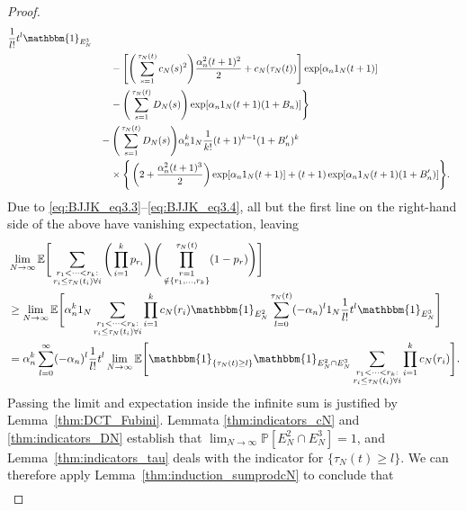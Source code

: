 \documentclass[12pt,authoryear]{article}
\theoremstyle{definition}
\newcommand{\Prob}{\mathbb{P}}
\newcommand{\E}{\mathbb{E}}
\newcommand{\I}[1]{\mathbbm{1}_{\{#1\}}}
\newcommand{\1}[1]{\mathbbm{1}_{#1}}
\newcommand{\ON}{1_N}
\begin{document}
\begin{proof}
\begin{align*}
        \frac{1}{l!} t^l \1{E_N^3} \\
    &\phantom{\geq \times} - \Bigg[ \Bigg( \sum_{s=1}^{\tau_N(t)} c_N(s)^2 \Bigg)
        \frac{\alpha_n^2 (t+1)^2}{2} + c_N(\tau_N(t)) \Bigg] \exp[ \alpha_n \ON (t+1) ] \\
    &\phantom{\geq \times}
    - \Bigg( \sum_{s=1}^{\tau_N(t)} D_N(s) \Bigg)
        \exp[ \alpha_n \ON (t+1) (1+B_n) ] \Bigg\} \\
&\phantom{\geq} - \Bigg( \sum_{s=1}^{\tau_N(t)} D_N(s) \Bigg)
        \alpha_n^k \ON \frac{1}{k!}
        (t+1)^{k-1} (1+B_n^\prime)^k \\
    &\phantom{\geq -} \times \Bigg\{\left( 2 + \frac{\alpha_n^2 (t+1)^3}{2} \right) 
        \exp[ \alpha_n \ON (t+1) ] + (t+1) \exp[ \alpha_n \ON (t+1) (1+B_n^\prime) ] 
        \Bigg\} .
\end{align*}
Due to \eqref{eq:BJJK_eq3.3}--\eqref{eq:BJJK_eq3.4}, all but the first line on the right-hand side of the above have vanishing expectation, leaving
\begin{align}
&\lim_{N\to\infty} \E \Bigg[ 
        \sum_{\substack{r_1 <\dots< r_k :\\ r_i \leq \tau_N(t_i) \forall i}}
        \Bigg( \prod_{i=1}^k p_{r_i} \Bigg)
        \Bigg( \prod_{\substack{r=1 \\ \notin \{r_1,\dots,r_k\} }}^{\tau_N(t)} 
        (1-p_r) \Bigg) \Bigg] \notag\\
&\geq \lim_{N\to\infty} \E \Bigg[ \alpha_n^k \ON
        \sum_{\substack{r_1 <\dots< r_k :\\ r_i \leq \tau_N(t_i) \forall i}}
        \prod_{i=1}^k c_N(r_i) \1{E_N^2}
        \sum_{l=0}^{\tau_N(t)} (-\alpha_n)^l \ON 
        \frac{1}{l!} t^l \1{E_N^3} \Bigg] \notag\\
&= \alpha_n^k
        \sum_{l=0}^{\infty} (-\alpha_n)^l
        \frac{1}{l!} t^l
        \lim_{N\to\infty}\E\Bigg[ \I{\tau_N(t) \geq l} \1{E_N^2\cap E_N^3}
        \sum_{\substack{r_1 <\dots< r_k :\\ r_i \leq \tau_N(t_i) \forall i}}
        \prod_{i=1}^k c_N(r_i) \Bigg] . \label{eq:056}
\end{align}
Passing the limit and expectation inside the infinite sum is justified by Lemma~\ref{thm:DCT_Fubini}.
Lemmata \ref{thm:indicators_cN} and \ref{thm:indicators_DN} establish that $\lim_{N\to\infty}\Prob[ E_N^2 \cap E_N^3 ] =1$, and Lemma~\ref{thm:indicators_tau} deals with the indicator for $\{ \tau_N( t ) \geq l \}$.
We can therefore apply Lemma~\ref{thm:induction_sumprodcN} to conclude that
\begin{align*}

\end{align*}
\end{proof}
\end{document}
